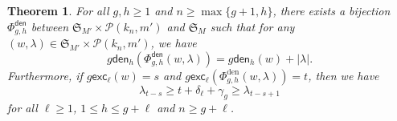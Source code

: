 \documentclass[12pt]{article}
\numberwithin{equation}{section}
\theoremstyle{plain}
\newtheorem{theorem}{Theorem}[section]
\def\exc{\mathsf{exc}}
\def\den{\mathsf{den}}
\begin{document}
 \begin{theorem}\label{th-Phi-den}
 	For  all $g,    h\geq 1$ and  $n\geq \max\{g+1, h\}$,   there exists  a bijection $\Phi^{\den}_{g, h}$ between $\mathfrak{S}_{M'}\times \mathcal{P}(k_n, m')$ and  $ \mathfrak{S}_{M}$  such  that for any $(w, \lambda)\in   \mathfrak{S}_{M'}\times  \mathcal{P}(k_n, m')$,   we have 
 	\begin{equation}\label{eq-Phiden1}
 		g\den_h(\Phi^{\den}_{g, h}(w, \lambda))=g\den_{h}(w)+|\lambda|.
 	\end{equation}
 Furthermore,    if   $g\exc_{\ell}(w)=s$ and $g\exc_{\ell}(\Phi^{\mathrm{den}}_{g,h}(w, \lambda))=t$,   then   we have
 	\begin{equation}\label{eq-Phiden2}
 		\lambda_{t-s}\geq t+\delta_\ell+\gamma_g \geq \lambda_{t-s+1}
 	\end{equation} 
for all $\ell\geq 1$, $1\leq h\leq g+\ell $ and $n\geq g+\ell$.
 \end{theorem}
 
\end{document}
